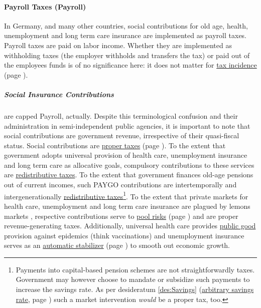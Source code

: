 \paragraph{Payroll Taxes (Payroll)}  \label{sec:Payroll} In Germany, and many other countries, social contributions for old age, health, unemployment and long term care insurance are implemented as payroll taxes. Payroll taxes are paid on labor income. Whether they are implemented as withholding taxes (the employer withholds and transfers the tax) or paid out of the employees funds is of no significance here: it does not matter for \hyperref[sec:TaxIncidence]{tax incidence} (page \pageref{sec:TaxIncidence}).

\subparagraph{Social Insurance Contributions}  \label{sec:SIC} are capped  \gls{Payroll}, actually. Despite this terminological confusion and their administration in semi-independent public agencies, it is important to note that social contributions are government revenue, irrespective of their quasi-fiscal status. Social contributions are \hyperref[sec:PurposesOfTaxation]{proper taxes} (page \pageref{sec:PurposesOfTaxation}). To the extent that government adopts universal provision of health care, unemployment insurance and long term care as allocative goals, compulsory contributions to these services are \hyperref[sec:Redistribution]{redistributive taxes}. To the extent that government finances old-age pensions out of current incomes, such PAYGO contributions are intertemporally and intergenerationally \hyperref[sec:Redistribution]{redistributive taxes}\footnote{
	Payments into capital-based pension schemes are not straightforwardly taxes. Government may however choose to mandate or subsidize such payments to increase the savings rate. As per desideratum \ref{des:Savings} (\hyperref[des:Savings]{arbitrary savings rate}, page \pageref{des:Savings}) such a market intervention \emph{would} be a proper tax, too.}.
To the extent that private markets for health care, unemployment and long term care insurance are plagued by lemons markets \citep{Akerlof-1970-aa}, respective contributions serve to \hyperref[sec:RiskPooling]{pool risks} (page \pageref{sec:RiskPooling}) and are proper revenue-generating taxes. Additionally, universal health care provides \hyperref[sec:PublicGood]{public good} provision against epidemics (think vaccinations) and unemployment insurance serves as an \hyperref[des:AutomaticStabilizer]{automatic stabilizer} (page \pageref{des:AutomaticStabilizer}) to smooth out economic growth.

